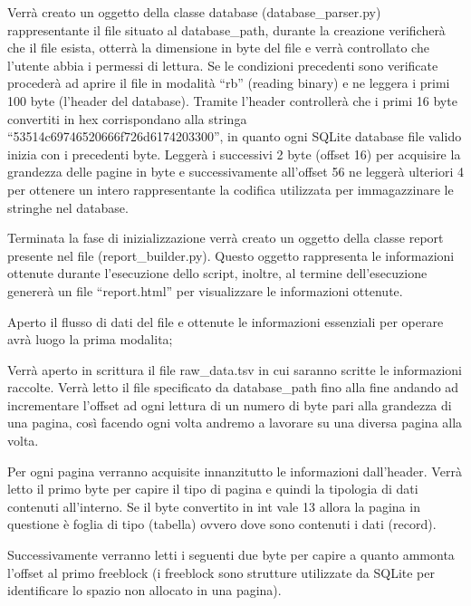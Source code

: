 Verrà creato un oggetto della classe database (database\string_parser.py) rappresentante il file situato al database\string_path, durante la creazione verificherà che il file esista, otterrà la dimensione in byte del file e verrà controllato che l’utente abbia i permessi di lettura. 
Se le condizioni precedenti sono verificate procederà ad aprire il file in modalità “rb” (reading binary) e ne leggera i primi 100 byte (l’header del database).
Tramite l’header controllerà che i primi 16 byte convertiti in hex corrispondano alla stringa “53514c69746520666f726d6174203300”, in quanto ogni SQLite database file valido inizia con i precedenti byte.
Leggerà i successivi 2 byte (offset 16) per acquisire la grandezza delle pagine in byte e successivamente all’offset 56 ne leggerà ulteriori 4 per ottenere un intero rappresentante la codifica utilizzata per immagazzinare le stringhe nel database.

\medskip

Terminata la fase di inizializzazione verrà creato un oggetto della classe report presente nel file (report\string_builder.py). Questo oggetto rappresenta le informazioni ottenute durante l’esecuzione dello script, inoltre, al termine dell’esecuzione genererà un file “report.html” per visualizzare le informazioni ottenute.

\medskip

Aperto il flusso di dati del file e ottenute le informazioni essenziali per operare avrà luogo la prima modalita;

\medskip

Verrà aperto in scrittura il file raw\string_data.tsv in cui saranno scritte le informazioni raccolte.
Verrà letto il file specificato da database\string_path fino alla fine andando ad incrementare l’offset ad ogni lettura di un numero di byte pari alla grandezza di una pagina, così facendo ogni volta andremo a lavorare su una diversa pagina alla volta.

\medskip

Per ogni pagina verranno acquisite innanzitutto le informazioni dall’header.
Verrà letto il primo byte per capire il tipo di pagina e quindi la tipologia di dati contenuti all’interno. 
Se il byte convertito in int vale 13 allora la pagina in questione è foglia di tipo (tabella) ovvero dove sono contenuti i dati (record).

\medskip

Successivamente verranno letti i seguenti due byte per capire a quanto ammonta l’offset al primo freeblock (i freeblock sono strutture utilizzate da SQLite per identificare lo spazio non allocato in una pagina).

